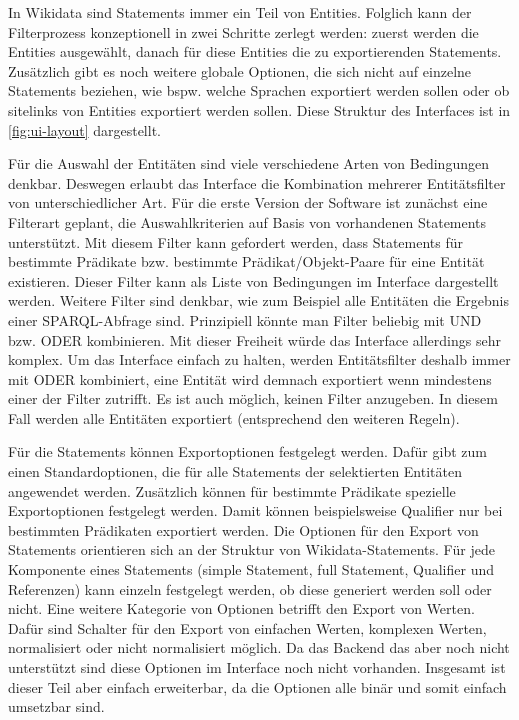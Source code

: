 In Wikidata sind Statements immer ein Teil von Entities.
Folglich kann der Filterprozess konzeptionell in zwei Schritte zerlegt werden: zuerst werden die Entities ausgewählt, danach für diese Entities die zu exportierenden Statements.
Zusätzlich gibt es noch weitere globale Optionen, die sich nicht auf einzelne Statements beziehen, wie bspw. welche Sprachen exportiert werden sollen oder ob sitelinks von Entities exportiert werden sollen.
Diese Struktur des Interfaces ist in \cref{fig:ui-layout} dargestellt.

Für die Auswahl der Entitäten sind viele verschiedene Arten von Bedingungen denkbar.
Deswegen erlaubt das Interface die Kombination mehrerer Entitätsfilter von unterschiedlicher Art.
Für die erste Version der Software ist zunächst eine Filterart geplant, die Auswahlkriterien auf Basis von vorhandenen Statements unterstützt. 
Mit diesem Filter kann gefordert werden, dass Statements für bestimmte Prädikate bzw. bestimmte Prädikat/Objekt-Paare für eine Entität existieren.
Dieser Filter kann als Liste von Bedingungen im Interface dargestellt werden.
Weitere Filter sind denkbar, wie zum Beispiel alle Entitäten die Ergebnis einer SPARQL-Abfrage sind.
Prinzipiell könnte man Filter beliebig mit UND bzw. ODER kombinieren.
Mit dieser Freiheit würde das Interface allerdings sehr komplex.
Um das Interface einfach zu halten, werden Entitätsfilter deshalb immer mit ODER kombiniert, eine Entität wird demnach exportiert wenn mindestens einer der Filter zutrifft.
Es ist auch möglich, keinen Filter anzugeben.
In diesem Fall werden alle Entitäten exportiert (entsprechend den weiteren Regeln).

Für die Statements können Exportoptionen festgelegt werden.
Dafür gibt zum einen Standardoptionen, die für alle Statements der selektierten Entitäten angewendet werden.
Zusätzlich können für bestimmte Prädikate spezielle Exportoptionen festgelegt werden.
Damit können beispielsweise Qualifier nur bei bestimmten Prädikaten exportiert werden.
Die Optionen für den Export von Statements orientieren sich an der Struktur von Wikidata-Statements.
Für jede Komponente eines Statements (simple Statement, full Statement, Qualifier und Referenzen) kann einzeln festgelegt werden, ob diese generiert werden soll oder nicht.
Eine weitere Kategorie von Optionen betrifft den Export von Werten.
Dafür sind Schalter für den Export von einfachen Werten, komplexen Werten, normalisiert oder nicht normalisiert möglich.
Da das Backend das aber noch nicht unterstützt sind diese Optionen im Interface noch nicht vorhanden.
Insgesamt ist dieser Teil aber einfach erweiterbar, da die Optionen alle binär und somit einfach umsetzbar sind.

